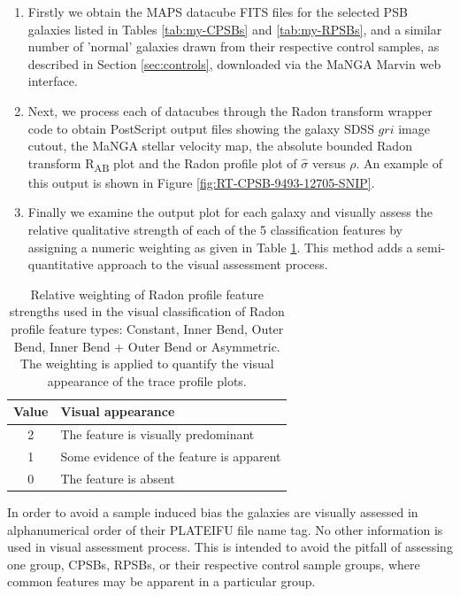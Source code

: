 \begin{enumerate}
    \item Firstly we obtain the MAPS datacube FITS files for the selected PSB galaxies listed in Tables \ref{tab:my-CPSBs} and \ref{tab:my-RPSBs}, and a similar number of 'normal' galaxies drawn from their respective control samples, as described in Section \ref{sec:controls}, downloaded via the MaNGA Marvin web interface.
    \item Next, we process each of datacubes through the Radon transform wrapper code to obtain PostScript output files showing the galaxy SDSS $gri$ image cutout, the MaNGA stellar velocity map, the absolute bounded Radon transform R\textsubscript{AB} plot and the Radon profile plot of $\hat{\sigma}$ versus $\rho$. An example of this output is shown in Figure \ref{fig:RT-CPSB-9493-12705-SNIP}. 
    \item  Finally we examine the output plot for each galaxy and visually assess the relative qualitative strength of each of the 5 classification features by assigning a numeric weighting as given in Table \ref{tab:features}. This method adds a semi-quantitative approach to the visual assessment process.
\end{enumerate}

\begin{table}
    \caption[Relative weighting of Radon profile feature strengths used in visual classification]{Relative weighting of Radon profile feature strengths used in the visual classification of Radon profile feature types: Constant, Inner Bend, Outer Bend, Inner Bend + Outer Bend or Asymmetric. The weighting is applied to quantify the visual appearance of the trace profile plots.}
    \label{tab:features}
    \centering
    \begin{tabular}{cl}
    \hline
    Value & Visual appearance \\
    \hline
    2 & The feature is visually predominant \\
    1 & Some evidence of the feature is apparent \\
    0 & The feature is absent \\
    \hline
    \end{tabular}

\end{table}

In order to avoid a sample induced bias the galaxies are visually assessed in alphanumerical order of their PLATEIFU file name tag. No other information is used in visual assessment process. This is intended to avoid the pitfall of assessing one group, CPSBs, RPSBs, or their respective control sample groups, where common features may be apparent in a particular group. 

